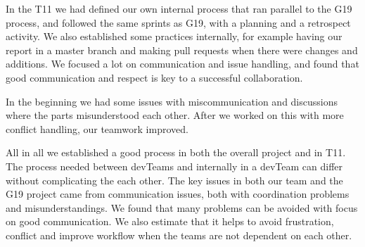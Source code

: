 In the \gls{T11} we had defined our own internal process that ran parallel to the \gls{G19} process, and followed the same sprints as \gls{G19}, with a planning and a retrospect activity. We also established some practices internally, for example having our report in a master branch and making pull requests when there were changes and additions.  We focused a lot on communication and issue handling, and found that good communication and respect is key to a successful collaboration. 

In the beginning we had some issues with miscommunication and discussions where the parts misunderstood each other. After we worked on this with more conflict handling, our teamwork improved. 

All in all we established a good process in both the overall project and in \gls{T11}. The process needed between \glspl{devTeam} and internally in a \gls{devTeam} can differ without complicating the each other. The key issues in both our team and the \gls{G19} project came from communication issues, both with coordination problems and misunderstandings. We found that many problems can be avoided with focus on good communication. We also estimate that it helps to avoid frustration, conflict and improve workflow when the teams are not dependent on each other. 
